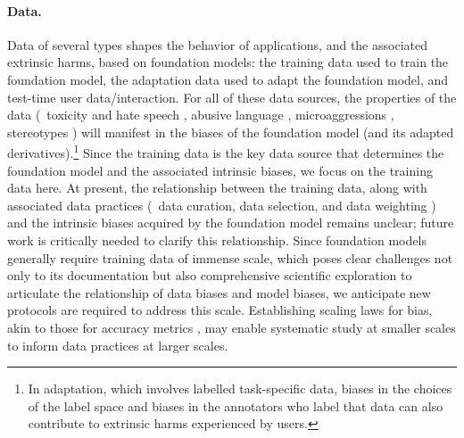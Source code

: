 \paragraph{Data.}
Data of several types shapes the behavior of applications, and the associated extrinsic harms, based on foundation models: the training data used to train the foundation model, the adaptation data used to adapt the foundation model, and test-time user data/interaction.
For all of these data sources, the properties of the data (\eg~toxicity and hate speech \citep{henderson17ethical},  abusive language \citep{waseem-etal-2017-understanding}, microaggressions \citep{breitfeller-etal-2019-finding}, stereotypes \citep{voigt-etal-2018-rtgender}) will manifest in the biases of the foundation model (and its adapted derivatives).\footnote{In adaptation, which involves labelled task-specific data, biases in the choices of the label space \cite{crawford2021} and biases in the annotators who label that data \citep{geva-etal-2019-modeling,sap-etal-2019-risk} can also contribute to extrinsic harms experienced by users.}
Since the training data is the key data source that determines the foundation model and the associated intrinsic biases, we focus on the training data here.
At present, the relationship between the training data, along with associated data practices (\eg~data curation, data selection, and data weighting \citep{paullada2020, bender2021, rogers2021}) and the intrinsic biases acquired by the foundation model remains unclear; future work is critically needed to clarify this relationship.
Since foundation models generally require training data of immense scale, which poses clear challenges not only to its documentation \citep{bender2021} but also comprehensive scientific exploration to articulate the relationship of data biases and model biases, we anticipate new protocols are required to address this scale.
Establishing scaling laws for bias, akin to those for accuracy metrics \citep{kaplan2020, henighan2020}, may enable systematic study at smaller scales to inform data practices at larger scales.

